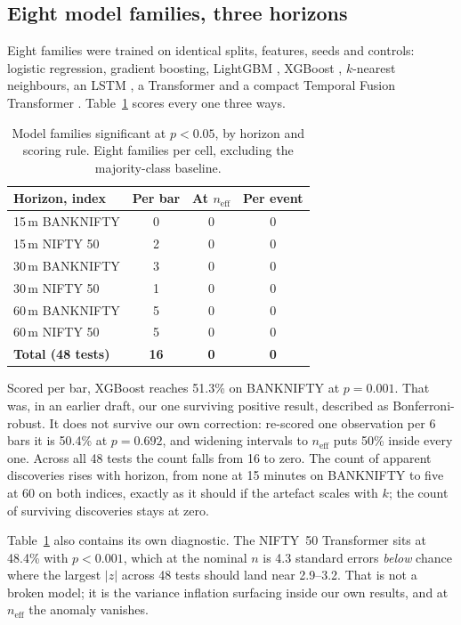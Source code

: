 \documentclass[conference]{IEEEtran}
\begin{document}
\subsection{Eight model families, three horizons}

Eight families were trained on identical splits, features, seeds and controls:
logistic regression, gradient boosting, LightGBM \cite{ke2017}, XGBoost
\cite{chen2016}, $k$-nearest neighbours, an
LSTM \cite{hochreiter1997}, a Transformer \cite{vaswani2017} and a compact
Temporal Fusion Transformer \cite{lim2021}. Table~\ref{tab:all} scores every one
three ways.

\begin{table}[t]
\caption{Model families significant at $p<0.05$, by horizon and scoring rule.
Eight families per cell, excluding the majority-class baseline.}
\label{tab:all}
\small
\footnotesize
\begin{tabular}{@{}lccc@{}}
\toprule
\textbf{Horizon, index} & \textbf{Per bar} & \textbf{At $n_{\text{eff}}$} &
\textbf{Per event} \\
\midrule
15\,m BANKNIFTY & 0 & 0 & 0 \\
15\,m NIFTY 50 & 2 & 0 & 0 \\
30\,m BANKNIFTY & 3 & 0 & 0 \\
30\,m NIFTY 50 & 1 & 0 & 0 \\
60\,m BANKNIFTY & 5 & 0 & 0 \\
60\,m NIFTY 50 & 5 & 0 & 0 \\
\midrule
\textbf{Total (48 tests)} & \textbf{16} & \textbf{0} & \textbf{0} \\
\bottomrule
\end{tabular}
\end{table}

Scored per bar, XGBoost reaches 51.3\% on BANKNIFTY at $p=0.001$. That was, in
an earlier draft, our one surviving positive result, described as
Bonferroni-robust. It does not survive our own correction: re-scored one
observation per 6 bars it is 50.4\% at $p=0.692$, and widening intervals to
$n_{\text{eff}}$ puts 50\% inside every one. Across all 48 tests the count falls
from 16 to zero. The count of apparent discoveries rises with horizon, from none
at 15 minutes on BANKNIFTY to five at 60 on both indices, exactly as it should if the
artefact scales with $k$; the count of surviving discoveries stays at zero.

Table~\ref{tab:all} also contains its own diagnostic. The NIFTY~50 Transformer
sits at 48.4\% with $p<0.001$, which at the nominal $n$ is 4.3 standard errors
\emph{below} chance where the largest $|z|$ across 48 tests should land near
2.9--3.2. That is not a broken model; it is the variance inflation
surfacing inside our own results, and at $n_{\text{eff}}$ the anomaly vanishes.
\end{document}
